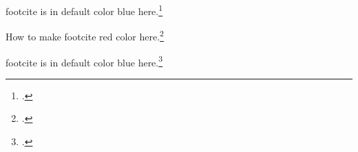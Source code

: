 \documentclass{beamer}
\begin{document}
\begin{frame}
footcite is in default color blue here.\footcite{knuth:ct}
\end{frame}

{
\begin{frame}
How to make footcite red color here.\footcite{knuth:ct}
\end{frame}
}

\begin{frame}
    footcite is in default color blue here.\footcite{knuth:ct}
\end{frame}

\begin{frame}
\printbibliography
\end{frame}
\end{document}

